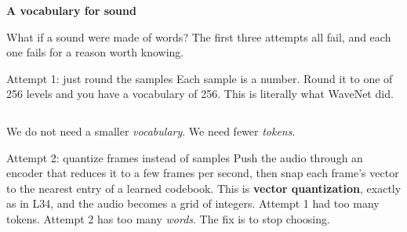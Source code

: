 \documentclass[aspectratio=169]{beamer}
\begin{document}
\begin{frame}[plain]
  \vfill
  \begin{center}
    {\Large\color{popblue}\textbf{A vocabulary for sound}}\\[0.9em]
    \begin{minipage}{0.82\textwidth}\centering\small
      What if a sound were made of words? The first three attempts all fail, and each one
      fails for a reason worth knowing.
    \end{minipage}
  \end{center}
  \vfill
\end{frame}

\begin{frame}{Attempt 1: just round the samples}
  \small
  Each sample is a number. Round it to one of 256 levels and you have a vocabulary of 256. This
  is literally what WaveNet did.
  \vskip 8pt
  \begin{columns}[T]
  \end{columns}
  \vskip 10pt
  \centering
  We do not need a smaller \emph{vocabulary}. We need fewer \emph{tokens}.
\end{frame}

\begin{frame}{Attempt 2: quantize frames instead of samples}
  \small
  Push the audio through an encoder that reduces it to a few frames per second, then snap each
  frame's vector to the nearest entry of a learned codebook. This is \textbf{vector
  quantization}, exactly as in L34, and the audio becomes a grid of integers.
  \vskip 8pt
  \vskip 8pt
  \centering
  Attempt 1 had too many tokens. Attempt 2 has too many \emph{words}. The fix is to stop
  choosing.
\end{frame}
\end{document}
